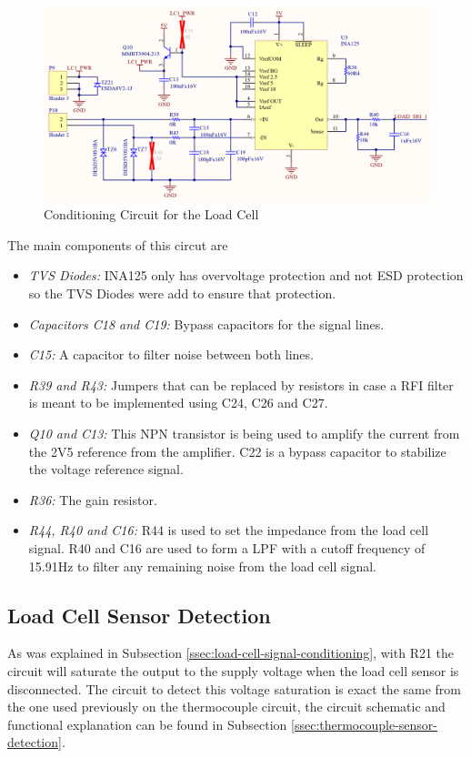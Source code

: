 	\begin{figure}[htbp]
		\centering
		\includegraphics[scale=0.8]{figuras/fig-cic-cell}
		\caption{Conditioning Circuit for the Load Cell}
		\label{fig:cic-cell}
	\end{figure}

	The main components of this circut are
	\begin{itemize}
		\item\textit{TVS Diodes:} INA125 only has overvoltage protection and not ESD protection so the TVS Diodes were add to ensure that protection.
		\item\textit{Capacitors C18 and C19:} Bypass capacitors for the signal lines.
		\item\textit{C15:} A capacitor to filter noise between both lines.
		\item\textit{R39 and R43:} Jumpers that can be replaced by resistors in case a RFI filter is meant to be implemented using C24, C26 and C27.
		\item\textit{Q10 and C13:} This NPN transistor is being used to amplify the current from the 2V5 reference from the amplifier. C22 is a bypass capacitor to stabilize the voltage reference signal.
		\item\textit{R36:} The gain resistor.
		\item\textit{R44, R40 and C16:} R44 is used to set the impedance from the load cell signal. R40 and C16 are used to form a LPF with a cutoff frequency of 15.91Hz to filter any remaining noise from the load cell signal.
	\end{itemize}

\subsection{Load Cell Sensor Detection}\label{ssec:load-cell-sensor-detection}
	As was explained in Subsection \ref{ssec:load-cell-signal-conditioning}, with R21 the circuit will saturate the output to the supply voltage when the load cell sensor is disconnected. The circuit to detect this voltage saturation is exact the same from the one used previously on the thermocouple circuit, the circuit schematic and functional explanation can be found in Subsection \ref{ssec:thermocouple-sensor-detection}.